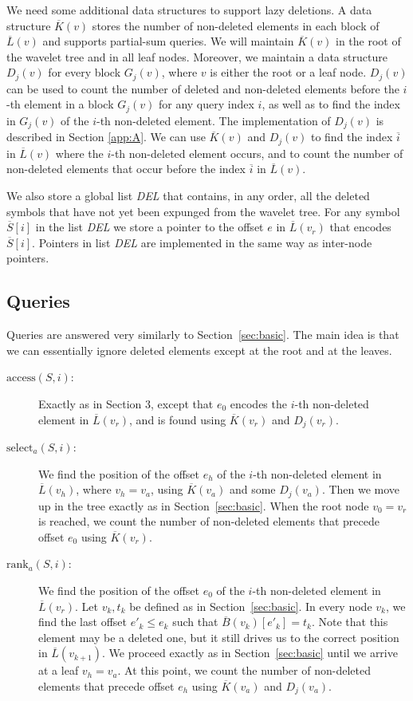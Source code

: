\documentclass[11pt]{article}
\def\idrm#1{\ensuremath{\mathrm{#1}}}
\newcommand{\oS}{\overline{S}}
\newcommand{\oL}{\overline{L}}
\newcommand{\oB}{\overline{B}}
\newcommand{\oP}{\overline{{ K}}}
\newcommand{\oi}{\overline{i}}
\newcommand{\ra}{\idrm{rank}}
\newcommand{\sel}{\idrm{select}}
\newcommand{\acc}{\idrm{access}}
\begin{document}
We need some additional data structures to support lazy deletions. 
A data structure $\oP(v)$ stores the number of non-deleted elements 
in each block of $\oL(v)$ and supports partial-sum queries. 
We will maintain $\oP(v)$ in the root of the wavelet tree and 
in all leaf nodes. Moreover, we maintain a data structure 
$D_j(v)$ for every block $G_j(v)$, where $v$ is either the root 
or a leaf node. $D_j(v)$ can be used to count the number of deleted 
and non-deleted elements before the $i$-th element in a block $G_j(v)$ for any query index $i$, as well as to find the index in $G_j(v)$ of the 
$i$-th non-deleted element. 
The implementation of $D_j(v)$ is described in Section \ref{app:A}. 
We can use $\oP(v)$ and $D_j(v)$ to find the index $\oi$ in $\oL(v)$
where the $i$-th non-deleted element occurs, and to count the number 
of non-deleted elements that occur before the index $\oi$ in $\oL(v)$. 

We also store a global list {\em DEL} that contains, in any order, all 
the deleted symbols that have not yet been expunged from the wavelet tree. 
For any symbol $\oS[i]$ in the list {\em DEL} we store a pointer to the 
offset $e$ in $\oL(v_r)$ that encodes $\oS[i]$. Pointers in 
list {\em DEL} are implemented in the same way  as inter-node
 pointers.

\subsection{Queries}

Queries are answered very similarly to 
Section~\ref{sec:basic}. The main idea is that we can essentially ignore
deleted elements except at the root and at the leaves.
\begin{description}
\item[$\acc(S,i)$:] 
Exactly as in Section 3, except that $e_0$ encodes the $i$-th 
non-deleted element in $\oL(v_r)$, and is found using $\oP(v_r)$ and $D_j(v_r)$.

\item[$\sel_a(S,i)$:] We find the position of the offset $e_h$ of the 
$i$-th non-deleted element in $\oL(v_h)$, where $v_h=v_a$, using $\oP(v_a)$ and some $D_j(v_a)$. 
Then we move up in the tree exactly as in Section~\ref{sec:basic}.
When the root node $v_0=v_r$ is reached, we count the number of non-deleted 
elements that precede offset $e_0$ using $\oP(v_r)$. 

\item[$\ra_a(S,i)$:] We find the position of the offset $e_0$ of the $i$-th 
non-deleted element in $\oL(v_r)$. Let $v_k,t_k$ be defined as in Section~\ref{sec:basic}. 
In every node $v_k$, we find the last offset $e'_k \le e_k$ such that
$\oB(v_k)[e'_k]=t_k$. Note that this element may be a deleted one, but it still drives us to
the correct position in $\oL(v_{k+1})$. We proceed exactly as in 
Section~\ref{sec:basic} until we arrive at a leaf $v_h=v_a$.
At this point, we count the number of non-deleted elements that precede 
offset $e_h$ using $\oP(v_a)$ and $D_j(v_a)$.
\end{description}
\end{document}
